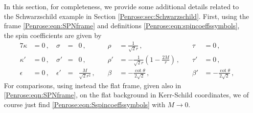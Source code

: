 In this section, for completeness, we provide some additional details related to the Schwarzschild example in Section \ref{Penrose:sec:Schwarzschild}. First, using the frame \eqref{Penrose:eqn:SPNframe} and definitions \eqref{Penrose:eqn:spincoeffssymbols}, the spin coefficients are given by 
\begin{alignat}{7}
\kappa &= 0 \, ,  \quad \sigma &=& 0 \, , \quad &\rho& = \frac{1}{\sqrt{2} r} \, , \quad &\tau& = 0  \, , \nonumber \\
\kappa' &= 0 \, ,  \quad \sigma' &=& 0 \, , \quad &\rho'& = -\frac{1}{\sqrt{2} r}(1-\frac{2M}{r}) \, , \quad &\tau'& = 0 \, , \nonumber  \\
\epsilon &= 0 \, ,  \quad \epsilon' &=& \frac{M}{\sqrt{2}r^2} \, , \quad &\beta& = -\frac{\cot{\theta}}{2\sqrt{2}} \, , \quad &\beta'& = -\frac{\cot{\theta}}{2\sqrt{2}}  \, ,  \label{Penrose:eqn:Sspincoeffssymbols}
\end{alignat}
For comparisons, using instead the flat frame, given also in  \eqref{Penrose:eqn:SPNframe}, on the flat background in
Kerr-Schild coordinates, we of course just find \eqref{Penrose:eqn:Sspincoeffssymbols} with $M \to 0$.


